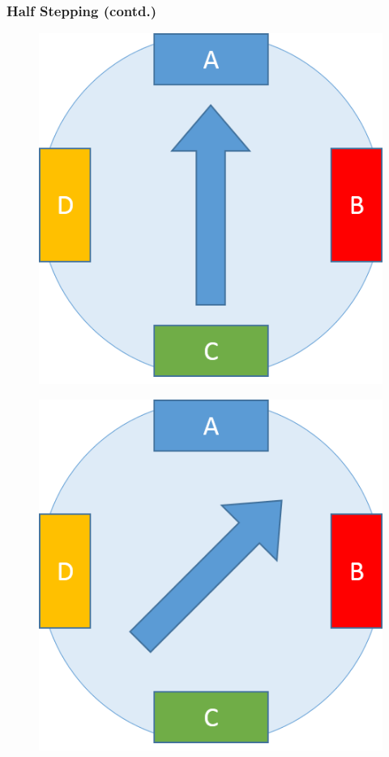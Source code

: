 \documentclass[table,10pt,red]{beamer}	%
\begin{document}
\begin{frame}
	\frametitle{Half Stepping (contd.)}
	\begin{minipage}[c]{0.24\textwidth}
		\begin{figure}
			\includegraphics[width=0.9\linewidth]{step1}
		\end{figure}
	\end{minipage}
	\begin{minipage}[c]{0.24\textwidth}
		\begin{figure}
			\includegraphics[width=0.9\linewidth]{step2}

\end{figure}
\end{minipage}
\end{frame}
\end{document}

